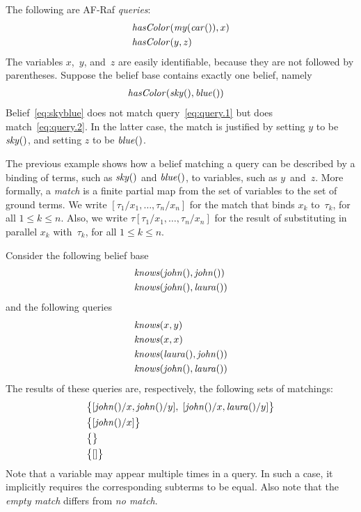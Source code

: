 \documentclass[a4paper,12pt,oneside,fleqn]{book} %
\begin{document}
\begin{example} The following are AF-Raf \emph{queries}: \begin{align}
&{\it hasColor}({\it my}({\it car}()), x) \label{eq:query.1} \\ &{\it
hasColor}(y, z) \label{eq:query.2} \end{align} The variables $x$,~$y$,
and~$z$ are easily identifiable, because they are not followed by
parentheses.  Suppose the belief base contains exactly one belief, namely
\begin{align} &{\it hasColor}({\it sky}(), {\it blue}()) \label{eq:skyblue}
\end{align} Belief~\eqref{eq:skyblue} does not match
query~\eqref{eq:query.1} but does match~\eqref{eq:query.2}.  In the latter
case, the match is justified by setting $y$ to be ${\it sky}()$, and
setting $z$ to be ${\it blue}()$.
\end{example}

The previous example shows how a belief matching a query can be described
by a binding of terms, such as ${\it sky}()$ and ${\it blue}()$, to
variables, such as $y$~and~$z$.  More formally, a \emph{match} is a finite
partial map from the set of variables to the set of ground terms.  We write
$[\tau_1/x_1,\ldots,\tau_n/x_n]$ for the match that binds $x_k$
to~$\tau_k$, for all $1\le k\le n$.  Also, we write
$\tau[\tau_1/x_1,\ldots,\tau_n/x_n]$ for the result of substituting in
parallel $x_k$ with~$\tau_k$, for all $1\le k\le n$.

\begin{example} Consider the following belief base \begin{align} &{\it
knows}({\it john}(), {\it john}()) \\ &{\it knows}({\it john}(), {\it
laura}()) \end{align} and the following queries \begin{align} &{\it
knows}(x, y) \\ &{\it knows}(x, x) \\ &{\it knows}({\it laura}(), {\it
john}()) \\ &{\it knows}({\it john}(), {\it laura}()) \end{align} The
results of these queries are, respectively, the following sets of
matchings: \begin{align} &\bigl\{ [{\it john}()/x, {\it john}()/y],\; [{\it
john}()/x,{\it laura}()/y] \bigr\} \\ &\bigl\{ [{\it john}()/x] \bigr\} \\
&\bigl\{\bigr\} \\ &\bigl\{[]\bigr\} \end{align} Note that a variable may
appear multiple times in a query.  In such a case, it implicitly requires
the corresponding subterms to be equal.  Also note that the \emph{empty
match} differs from \emph{no match}.
\end{example}
\end{document}
